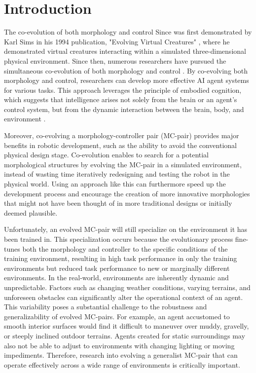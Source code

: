 \section{Introduction}
The co-evolution of both morphology and control Since was first demonstrated by Karl Sims in his 1994 publication, "Evolving Virtual Creatures" \cite{Karl_Sims_1994}, where he demonstrated virtual creatures interacting within a simulated three-dimensional physical environment. Since then, numerous researchers have pursued the simultaneous co-evolution of both morphology and control \cite{Cheney_2017,Emma_Stensby_2021,Joshua_Auerbach_2014,Luis_2024}. By co-evolving both morphology and control, researchers can develop more effective AI agent systems for various tasks. This approach leverages the principle of embodied cognition, which suggests that intelligence arises not solely from the brain or an agent's control system, but from the dynamic interaction between the brain, body, and environment \cite{Josh_Bongard_2013}.

Moreover, co-evolving a morphology-controller pair (MC-pair) provides major benefits in robotic development, such as the ability to avoid the conventional physical design stage. Co-evolution enables to search for a potential morphological structures by evolving the MC-pair in a simulated environment, instead of wasting time iteratively redesigning and testing the robot in the physical world. Using an approach like this can furthermore speed up the development process and encourage the creation of more innovative morphologies that might not have been thought of in more traditional designs or initially deemed plausible.

Unfortunately, an evolved MC-pair will still specialize on the environment it has been trained in. This specialization occurs because the evolutionary process fine-tunes both the morphology and controller to the specific conditions of the training environment, resulting in high task performance in only the training environments but reduced task performance to new or marginally different environments. In the real-world, environments are inherently dynamic and unpredictable. Factors such as changing weather conditions, varying terrains, and unforeseen obstacles can significantly alter the operational context of an agent. This variability poses a substantial challenge to the robustness and generalizability of evolved MC-pairs. For example, an agent accustomed to smooth interior surfaces would find it difficult to maneuver over muddy, gravelly, or steeply inclined outdoor terrains. Agents created for static surroundings may also not be able to adjust to environments with changing lighting or moving impediments. Therefore, research into evolving a generalist MC-pair that can operate effectively across a wide range of environments is critically important.

